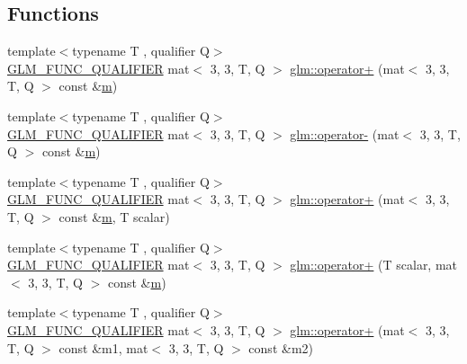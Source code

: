 \subsection*{Functions}
\begin{DoxyCompactItemize}
\item 
{\footnotesize template$<$typename T , qualifier Q$>$ }\\\mbox{\hyperlink{setup_8hpp_a33fdea6f91c5f834105f7415e2a64407}{G\+L\+M\+\_\+\+F\+U\+N\+C\+\_\+\+Q\+U\+A\+L\+I\+F\+I\+ER}} mat$<$ 3, 3, T, Q $>$ \mbox{\hyperlink{namespaceglm_af4a24f06d91e950c3338a6fcf3ae860c}{glm\+::operator+}} (mat$<$ 3, 3, T, Q $>$ const \&\mbox{\hyperlink{_s_d_l__opengl__glext_8h_af593500c283bf1a787a6f947f503a5c2}{m}})
\item 
{\footnotesize template$<$typename T , qualifier Q$>$ }\\\mbox{\hyperlink{setup_8hpp_a33fdea6f91c5f834105f7415e2a64407}{G\+L\+M\+\_\+\+F\+U\+N\+C\+\_\+\+Q\+U\+A\+L\+I\+F\+I\+ER}} mat$<$ 3, 3, T, Q $>$ \mbox{\hyperlink{namespaceglm_af2895c3e8acbc5da0e98094b6e29ed2d}{glm\+::operator-\/}} (mat$<$ 3, 3, T, Q $>$ const \&\mbox{\hyperlink{_s_d_l__opengl__glext_8h_af593500c283bf1a787a6f947f503a5c2}{m}})
\item 
{\footnotesize template$<$typename T , qualifier Q$>$ }\\\mbox{\hyperlink{setup_8hpp_a33fdea6f91c5f834105f7415e2a64407}{G\+L\+M\+\_\+\+F\+U\+N\+C\+\_\+\+Q\+U\+A\+L\+I\+F\+I\+ER}} mat$<$ 3, 3, T, Q $>$ \mbox{\hyperlink{namespaceglm_a9821f6d808bd7419d2517a0372c4d422}{glm\+::operator+}} (mat$<$ 3, 3, T, Q $>$ const \&\mbox{\hyperlink{_s_d_l__opengl__glext_8h_af593500c283bf1a787a6f947f503a5c2}{m}}, T scalar)
\item 
{\footnotesize template$<$typename T , qualifier Q$>$ }\\\mbox{\hyperlink{setup_8hpp_a33fdea6f91c5f834105f7415e2a64407}{G\+L\+M\+\_\+\+F\+U\+N\+C\+\_\+\+Q\+U\+A\+L\+I\+F\+I\+ER}} mat$<$ 3, 3, T, Q $>$ \mbox{\hyperlink{namespaceglm_a7703e906dcce9ba3439b7f100b34e4f4}{glm\+::operator+}} (T scalar, mat$<$ 3, 3, T, Q $>$ const \&\mbox{\hyperlink{_s_d_l__opengl__glext_8h_af593500c283bf1a787a6f947f503a5c2}{m}})
\item 
{\footnotesize template$<$typename T , qualifier Q$>$ }\\\mbox{\hyperlink{setup_8hpp_a33fdea6f91c5f834105f7415e2a64407}{G\+L\+M\+\_\+\+F\+U\+N\+C\+\_\+\+Q\+U\+A\+L\+I\+F\+I\+ER}} mat$<$ 3, 3, T, Q $>$ \mbox{\hyperlink{namespaceglm_a16c9d9ea3cf7f6bb3f9cd95d525453f9}{glm\+::operator+}} (mat$<$ 3, 3, T, Q $>$ const \&m1, mat$<$ 3, 3, T, Q $>$ const \&m2)

\end{DoxyCompactItemize}
